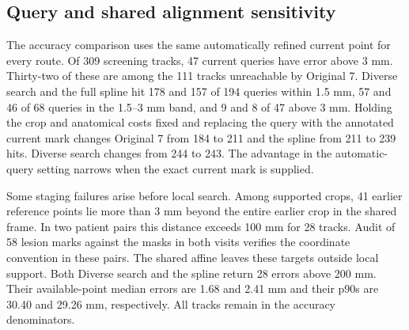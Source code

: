 \subsection{Query and shared alignment sensitivity}
The accuracy comparison uses the same automatically refined current point for every route. Of 309 screening tracks, 47 current queries have error above 3 mm. Thirty-two of these are among the 111 tracks unreachable by Original 7. Diverse search and the full spline hit 178 and 157 of 194 queries within 1.5 mm, 57 and 46 of 68 queries in the 1.5--3 mm band, and 9 and 8 of 47 above 3 mm. Holding the crop and anatomical costs fixed and replacing the query with the annotated current mark changes Original 7 from 184 to 211 and the spline from 211 to 239 hits. Diverse search changes from 244 to 243. The advantage in the automatic-query setting narrows when the exact current mark is supplied.

Some staging failures arise before local search. Among supported crops, 41 earlier reference points lie more than 3 mm beyond the entire earlier crop in the shared frame. In two patient pairs this distance exceeds 100 mm for 28 tracks. Audit of 58 lesion marks against the masks in both visits verifies the coordinate convention in these pairs. The shared affine leaves these targets outside local support. Both Diverse search and the spline return 28 errors above 200 mm. Their available-point median errors are 1.68 and 2.41 mm and their p90s are 30.40 and 29.26 mm, respectively. All tracks remain in the accuracy denominators.
